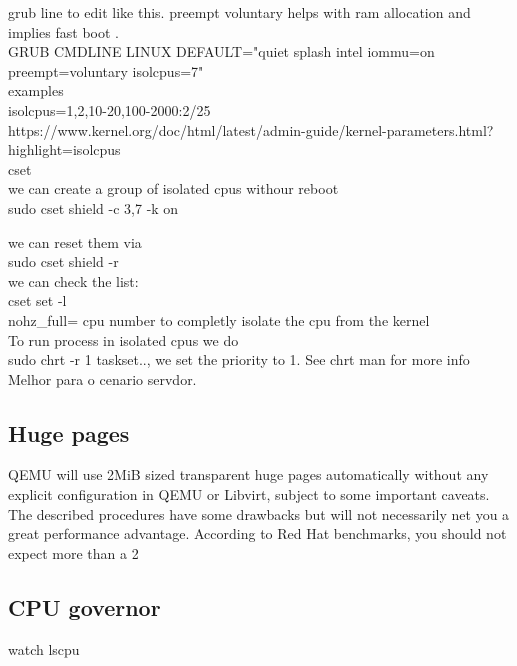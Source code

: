 \documentclass[11pt, a4paper, oneside]{article}
\theoremstyle{definition}
\begin{document}
grub line to edit like this. preempt voluntary helps with ram allocation and implies fast boot .\\
GRUB CMDLINE LINUX DEFAULT="quiet splash intel iommu=on preempt=voluntary isolcpus=7"\\

examples\\
isolcpus=1,2,10-20,100-2000:2/25\\

https://www.kernel.org/doc/html/latest/admin-guide/kernel-parameters.html?highlight=isolcpus\\

cset\\
we can create a group of isolated cpus withour reboot\\
sudo cset shield -c 3,7 -k on

we can reset them via \\
sudo cset shield -r\\

we can check the list: \\
cset set -l\\



nohz_full= cpu number to completly isolate the cpu from the kernel\\

To run process in isolated cpus we do \\
sudo chrt -r 1 taskset.., we set the priority to 1. See chrt man for more info\\

Melhor para o cenario servdor.\\

\subsection{Huge pages}
QEMU will use 2MiB sized transparent huge pages automatically without any explicit configuration in QEMU or Libvirt, subject to some important caveats.\\

The described procedures have some drawbacks but will not necessarily net you a great performance advantage. According to Red Hat benchmarks, you should not expect more than a 2%

\subsection{CPU governor}
watch lscpu\\
\end{document}
